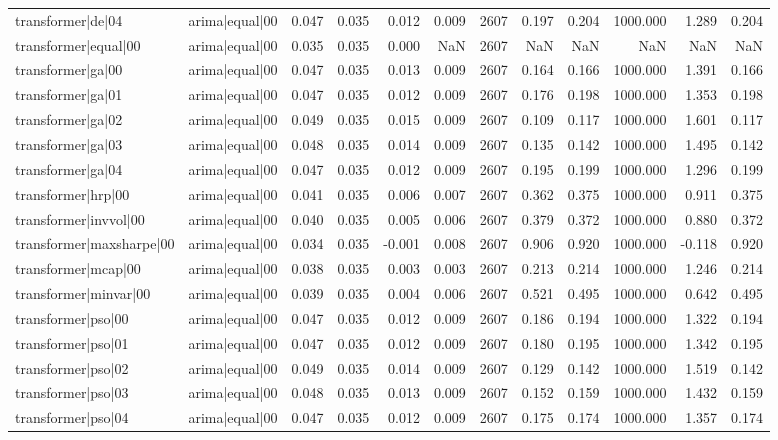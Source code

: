 \begin{table}
\begin{tabular}{llrrrrrrrrrr}
transformer|de|04 & arima|equal|00 & 0.047 & 0.035 & 0.012 & 0.009 & 2607 & 0.197 & 0.204 & 1000.000 & 1.289 & 0.204 \\
transformer|equal|00 & arima|equal|00 & 0.035 & 0.035 & 0.000 & NaN & 2607 & NaN & NaN & NaN & NaN & NaN \\
transformer|ga|00 & arima|equal|00 & 0.047 & 0.035 & 0.013 & 0.009 & 2607 & 0.164 & 0.166 & 1000.000 & 1.391 & 0.166 \\
transformer|ga|01 & arima|equal|00 & 0.047 & 0.035 & 0.012 & 0.009 & 2607 & 0.176 & 0.198 & 1000.000 & 1.353 & 0.198 \\
transformer|ga|02 & arima|equal|00 & 0.049 & 0.035 & 0.015 & 0.009 & 2607 & 0.109 & 0.117 & 1000.000 & 1.601 & 0.117 \\
transformer|ga|03 & arima|equal|00 & 0.048 & 0.035 & 0.014 & 0.009 & 2607 & 0.135 & 0.142 & 1000.000 & 1.495 & 0.142 \\
transformer|ga|04 & arima|equal|00 & 0.047 & 0.035 & 0.012 & 0.009 & 2607 & 0.195 & 0.199 & 1000.000 & 1.296 & 0.199 \\
transformer|hrp|00 & arima|equal|00 & 0.041 & 0.035 & 0.006 & 0.007 & 2607 & 0.362 & 0.375 & 1000.000 & 0.911 & 0.375 \\
transformer|invvol|00 & arima|equal|00 & 0.040 & 0.035 & 0.005 & 0.006 & 2607 & 0.379 & 0.372 & 1000.000 & 0.880 & 0.372 \\
transformer|maxsharpe|00 & arima|equal|00 & 0.034 & 0.035 & -0.001 & 0.008 & 2607 & 0.906 & 0.920 & 1000.000 & -0.118 & 0.920 \\
transformer|mcap|00 & arima|equal|00 & 0.038 & 0.035 & 0.003 & 0.003 & 2607 & 0.213 & 0.214 & 1000.000 & 1.246 & 0.214 \\
transformer|minvar|00 & arima|equal|00 & 0.039 & 0.035 & 0.004 & 0.006 & 2607 & 0.521 & 0.495 & 1000.000 & 0.642 & 0.495 \\
transformer|pso|00 & arima|equal|00 & 0.047 & 0.035 & 0.012 & 0.009 & 2607 & 0.186 & 0.194 & 1000.000 & 1.322 & 0.194 \\
transformer|pso|01 & arima|equal|00 & 0.047 & 0.035 & 0.012 & 0.009 & 2607 & 0.180 & 0.195 & 1000.000 & 1.342 & 0.195 \\
transformer|pso|02 & arima|equal|00 & 0.049 & 0.035 & 0.014 & 0.009 & 2607 & 0.129 & 0.142 & 1000.000 & 1.519 & 0.142 \\
transformer|pso|03 & arima|equal|00 & 0.048 & 0.035 & 0.013 & 0.009 & 2607 & 0.152 & 0.159 & 1000.000 & 1.432 & 0.159 \\
transformer|pso|04 & arima|equal|00 & 0.047 & 0.035 & 0.012 & 0.009 & 2607 & 0.175 & 0.174 & 1000.000 & 1.357 & 0.174 \\

\end{tabular}
\end{table}
